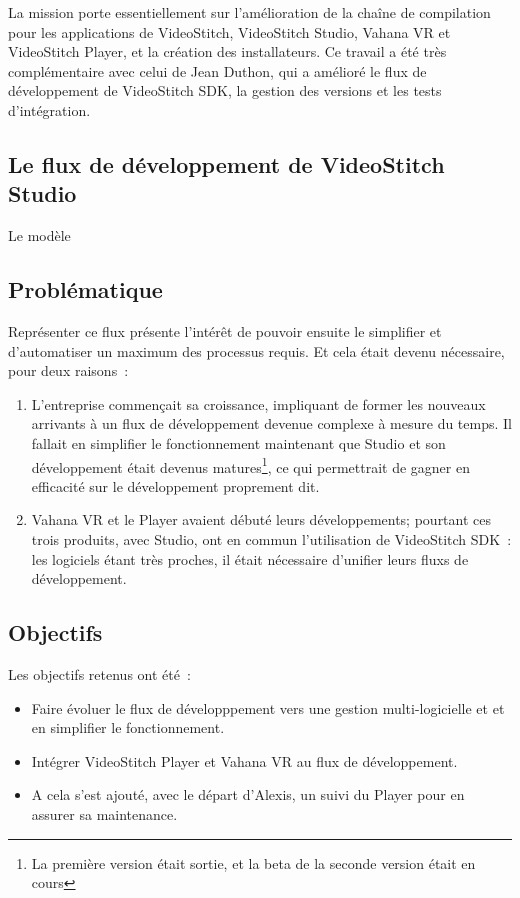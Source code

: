 La mission porte essentiellement sur l'amélioration de la chaîne de compilation
pour les applications de VideoStitch, VideoStitch Studio, Vahana VR et VideoStitch
Player, et la création des installateurs. Ce travail a été très complémentaire avec
celui de Jean Duthon, qui a amélioré le flux de développement de VideoStitch SDK,
la gestion des versions et les tests d'intégration.

\subsection{Le flux de développement de VideoStitch Studio} 
Le modèle 

\subsection{Problématique}
Représenter ce flux présente l'intérêt de pouvoir ensuite le simplifier et d'automatiser
un maximum des processus requis. Et cela était devenu nécessaire, pour deux raisons~:
\begin{enumerate}
  \item L'entreprise commençait sa croissance, impliquant de former les nouveaux arrivants
  à un flux de développement devenue complexe à mesure du temps. Il fallait en
  simplifier le fonctionnement maintenant que Studio et son développement était
  devenus matures\footnote{La première version était sortie, et la beta de la seconde
  version était en cours}, ce qui permettrait de gagner en efficacité sur le développement
  proprement dit.
  \item Vahana VR et le Player avaient débuté leurs développements; pourtant ces trois
  produits, avec Studio, ont en commun l'utilisation de VideoStitch SDK~: les logiciels
  étant très proches, il était nécessaire d'unifier leurs fluxs de développement.
\end{enumerate}

\subsection{Objectifs}
Les objectifs retenus ont été~:
\begin{itemize}
  \item Faire évoluer le flux de développpement vers une gestion multi-logicielle et 
  et en simplifier le fonctionnement.
  \item Intégrer VideoStitch Player et Vahana VR au flux de développement.
  \item A cela s'est ajouté, avec le départ d'Alexis, un suivi du Player pour en assurer
  sa maintenance.
\end{itemize}


